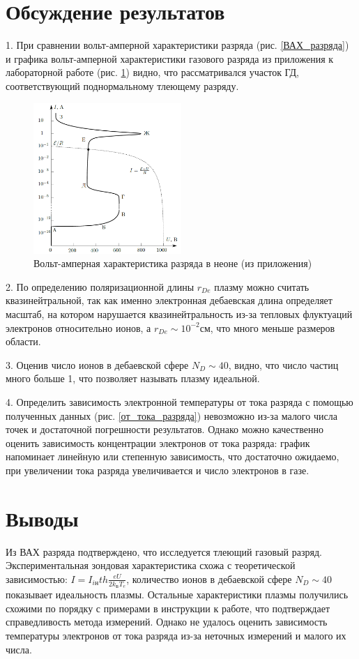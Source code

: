 \documentclass[a4paper,12pt]{article} %
\begin{document}
\section{Обсуждение результатов}


1.  При сравнении вольт-амперной характеристики разряда (рис. \ref{ВАХ_разряда}) и графика вольт-амперной характеристики газового разряда из приложения к лабораторной работе (рис. \ref{приложение}) видно, что рассматривался участок ГД, соответствующий поднормальному тлеющему разряду.

\begin{figure}[h!]
\begin{center}
\includegraphics[width=0.5\textwidth]{Приложение}
\caption{Вольт-амперная характеристика разряда в неоне (из приложения)} \label{приложение}
\end{center}
\end{figure}

2. По определению поляризационной длины $r_{De}$ плазму можно считать квазинейтральной, так как именно электронная дебаевская длина определяет масштаб, на котором нарушается квазинейтральность из-за тепловых флуктуаций электронов относительно ионов, а $r_{De} \sim 10^{-2} см$, что много меньше размеров области.

3. Оценив число ионов в дебаевской сфере $N_D \sim 40$, видно, что число частиц много больше 1, что позволяет называть плазму идеальной.

4. Определить зависимость электронной температуры от тока разряда с помощью полученных данных (рис. \ref{от_тока_разряда}) невозможно из-за малого числа точек и достаточной погрешности результатов. Однако можно качественно оценить зависимость концентрации электронов от тока разряда: график напоминает линейную или степенную зависимость, что достаточно ожидаемо, при увеличении тока разряда увеличивается и число электронов в газе.


\section{Выводы}
Из ВАХ разряда подтверждено, что исследуется тлеющий газовый разряд. 
Экспериментальная зондовая характеристика схожа с теоретической зависимостью: $I = I_{iн} th\frac{eU}{2k_БT_e}$, количество ионов в дебаевской сфере $N_D \sim 40$ показывает идеальность плазмы. Остальные характеристики плазмы получились схожими по порядку с примерами в инструкции к работе, что подтверждает справедливость метода измерений. Однако не удалось оценить зависимость температуры электронов от тока разряда из-за неточных измерений и малого их числа.
\end{document}
